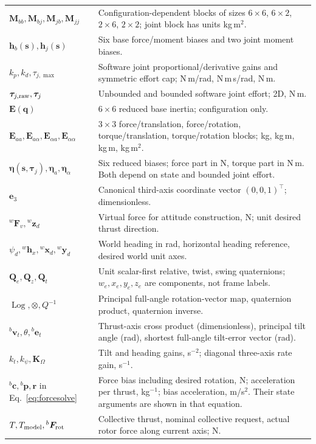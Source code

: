 \documentclass[11pt,a4paper]{article}
\newcommand{\vct}[1]{\boldsymbol{#1}}
\newcommand{\mat}[1]{\mathbf{#1}}
\newcommand{\bv}[1]{{}^{b}\vct{#1}}
\newcommand{\wv}[1]{{}^{w}\vct{#1}}
\newcommand{\e}{\vct e_3}
\begin{document}
\begin{longtable}{L{4.2cm}L{10.5cm}}
$\mat M_{bb},\mat M_{bj},\mat M_{jb},\mat M_{jj}$ & Configuration-dependent blocks of sizes $6\times6$, $6\times2$, $2\times6$, $2\times2$; joint block has units kg\,m$^2$.\\
$\vct h_b(\vct s),\vct h_j(\vct s)$ & Six base force/moment biases and two joint moment biases.\\
$k_p,k_d,\tau_{j,\max}$ & Software joint proportional/derivative gains and symmetric effort cap; N\,m/rad, N\,m\,s/rad, N\,m.\\
$\vct\tau_{j,\rm raw},\vct\tau_j$ & Unbounded and bounded software joint effort; 2D, N\,m.\\
$\mat E(\vct q)$ & $6\times6$ reduced base inertia; configuration only.\\
$\mat E_{aa},\mat E_{a\alpha},\mat E_{\alpha a},\mat E_{\alpha\alpha}$ & $3\times3$ force/translation, force/rotation, torque/translation, torque/rotation blocks; kg, kg\,m, kg\,m, kg\,m$^2$.\\
$\vct\eta(\vct s,\vct\tau_j),\vct\eta_a,\vct\eta_\alpha$ & Six reduced biases; force part in N, torque part in N\,m. Both depend on state and bounded joint effort.\\
$\e$ & Canonical third-axis coordinate vector $(0,0,1)^\top$; dimensionless.\\
$\wv F_v,\wv z_d$ & Virtual force for attitude construction, N; unit desired thrust direction.\\
$\psi_d,\wv h_x,\wv x_d,\wv y_d$ & World heading in rad, horizontal heading reference, desired world unit axes.\\
$\vct Q_e,\vct Q_z,\vct Q_t$ & Unit scalar-first relative, twist, swing quaternions; $w_e,x_e,y_e,z_e$ are components, not frame labels.\\
$\operatorname{Log},\otimes,Q^{-1}$ & Principal full-angle rotation-vector map, quaternion product, quaternion inverse.\\
$\bv v_t,\theta,\bv e_t$ & Thrust-axis cross product (dimensionless), principal tilt angle (rad), shortest full-angle tilt-error vector (rad).\\
$k_t,k_\psi,\mat K_\Omega$ & Tilt and heading gains, s$^{-2}$; diagonal three-axis rate gain, s$^{-1}$.\\
$\bv c,\bv p,\vct r$ in Eq.~\eqref{eq:forcesolve} & Force bias including desired rotation, N; acceleration per thrust, kg$^{-1}$; bias acceleration, m/s$^2$. Their state arguments are shown in that equation.\\
$T,T_{\rm model},\bv F_{\rm rot}$ & Collective thrust, nominal collective request, actual rotor force along current axis; N.\\

\end{longtable}
\end{document}
